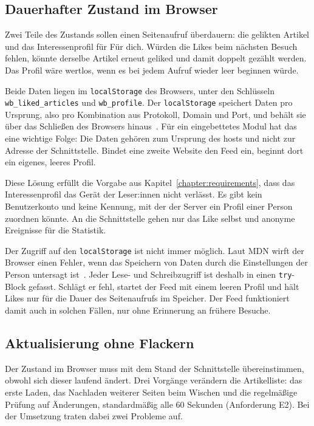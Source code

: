 \subsection{Dauerhafter Zustand im Browser}

Zwei Teile des Zustands sollen einen Seitenaufruf überdauern: die gelikten Artikel und das Interessenprofil für \glqq Für dich\grqq{}.
Würden die Likes beim nächsten Besuch fehlen, könnte derselbe Artikel erneut geliked und damit doppelt gezählt werden.
Das Profil wäre wertlos, wenn es bei jedem Aufruf wieder leer beginnen würde.

Beide Daten liegen im \texttt{localStorage} des Browsers, unter den Schlüsseln \texttt{wb\_\allowbreak{}liked\_\allowbreak{}articles} und \texttt{wb\_\allowbreak{}profile}.
Der \texttt{localStorage} speichert Daten pro Ursprung, also pro Kombination aus Protokoll, Domain und Port, und behält sie über das Schließen des Browsers hinaus~\cite{mdnlocalstorage}.
Für ein eingebettetes Modul hat das eine wichtige Folge: Die Daten gehören zum Ursprung des \gls{host}s und nicht zur Adresse der Schnittstelle.
Bindet eine zweite Website den Feed ein, beginnt dort ein eigenes, leeres Profil.

Diese Lösung erfüllt die Vorgabe aus Kapitel~\ref{chapter:requirements}, dass das Interessenprofil das Gerät der Leser:innen nicht verlässt.
Es gibt kein Benutzerkonto und keine Kennung, mit der der Server ein Profil einer Person zuordnen könnte.
An die Schnittstelle gehen nur das Like selbst und anonyme Ereignisse für die Statistik.

Der Zugriff auf den \texttt{localStorage} ist nicht immer möglich.
Laut MDN wirft der Browser einen Fehler, wenn das Speichern von Daten durch die Einstellungen der Person untersagt ist~\cite{mdnlocalstorage}.
Jeder Lese- und Schreibzugriff ist deshalb in einen \texttt{try}-Block gefasst.
Schlägt er fehl, startet der Feed mit einem leeren Profil und hält Likes nur für die Dauer des Seitenaufrufs im Speicher.
Der Feed funktioniert damit auch in solchen Fällen, nur ohne Erinnerung an frühere Besuche.

\subsection{Aktualisierung ohne Flackern}

Der Zustand im Browser muss mit dem Stand der Schnittstelle übereinstimmen, obwohl sich dieser laufend ändert.
Drei Vorgänge verändern die Artikelliste: das erste Laden, das Nachladen weiterer Seiten beim Wischen und die regelmäßige Prüfung auf Änderungen, standardmäßig alle 60 Sekunden (Anforderung E2).
Bei der Umsetzung traten dabei zwei Probleme auf.

